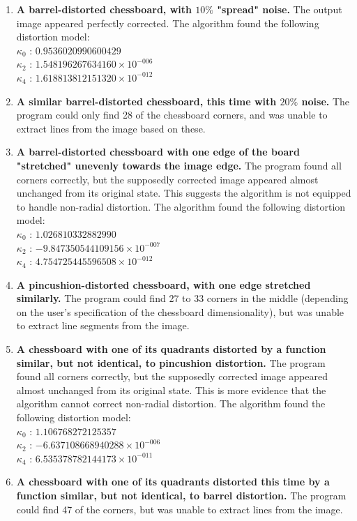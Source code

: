 \begin{enumerate}
  \item \textbf{A barrel-distorted chessboard, with $10\%$ "spread" noise.} The output image appeared perfectly corrected. The algorithm found the following distortion model:\\
   $ \kappa_{0}$ : $0.9536020990600429$\\
   $ \kappa_{2}$ : $1.548196267634160 \times 10^{-006}$\\
   $ \kappa_{4}$ : $1.618813812151320 \times 10^{-012}$
  \item \textbf{A similar barrel-distorted chessboard, this time with $20\%$ noise.} The program could only find 28 of the chessboard corners, and was unable to extract lines from the image based on these.
  \item \textbf{A barrel-distorted chessboard with one edge of the board "stretched" unevenly towards the image edge.} The program found all corners correctly, but the supposedly corrected image appeared almost unchanged from its original state. This suggests the algorithm is not equipped to handle non-radial distortion. The algorithm found the following distortion model:\\
   $ \kappa_{0}$ : $1.026810332882990$\\
   $ \kappa_{2}$ : $-9.847350544109156 \times 10^{-007}$\\
   $ \kappa_{4}$ : $4.754725445596508 \times 10^{-012}$
  \item \textbf{A pincushion-distorted chessboard, with one edge stretched similarly.} The program could find 27 to 33 corners in the middle (depending on the user's specification of the chessboard dimensionality), but was unable to extract line segments from the image.
  \item \textbf{A chessboard with one of its quadrants distorted by a function similar, but not identical, to pincushion distortion.} The program found all corners correctly, but the supposedly corrected image appeared almost unchanged from its original state. This is more evidence that the algorithm cannot correct non-radial distortion. The algorithm found the following distortion model:\\
   $ \kappa_{0}$ : $1.106768272125357$\\
   $ \kappa_{2}$ : $-6.637108668940288 \times 10^{-006}$\\
   $ \kappa_{4}$ : $6.535378782144173 \times 10^{-011}$
  \item \textbf{A chessboard with one of its quadrants distorted this time by a function similar, but not identical, to barrel distortion.} The program could find 47 of the corners, but was unable to extract lines from the image.
\end{enumerate}

